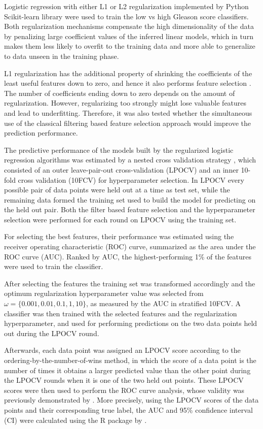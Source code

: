 Logistic regression with either L1 or L2 regularization \citep{Friedman2010}
implemented by Python Scikit-learn library \citep{Pedregosa2011} were used to
train the low vs high Gleason score classifiers. Both regularization mechanisms
compensate the high dimensionality of the data by penalizing large coefficient
values of the inferred linear models, which in turn makes them less likely to
overfit to the training data and more able to generalize to data unseen in the
training phase.

L1 regularization has the additional property of shrinking the coefficients of
the least useful features down to zero, and hence it also performs feature
selection \citep{Park2007}. The number of coefficients ending down to zero
depends on the amount of regularization. However, regularizing too strongly
might lose valuable features and lead to underfitting. Therefore, it was also
tested whether the simultaneous use of the classical filtering based feature
selection approach would improve the prediction performance.

The predictive performance of the models built by the regularized logistic
regression algorithms was estimated by a nested cross validation strategy
\citep{Varma2006}, which consisted of an outer leave-pair-out cross-validation
(LPOCV) \citep{Airola2011} and an inner 10-fold cross validation (10FCV) for
hyperparameter selection. In LPOCV every possible pair of data points were held
out at a time as test set, while the remaining data formed the training set used
to build the model for predicting on the held out pair. Both the filter based
feature selection and the hyperparameter selection were performed for each
round on LPOCV using the training set.

For selecting the best features, their performance was estimated using the
receiver operating characteristic (ROC) curve, summarized as the area under the
ROC curve (AUC). Ranked by AUC, the highest-performing 1\% of the features were
used to train the classifier.

After selecting the features the training set was transformed accordingly and
the optimum regularization hyperparameter value was selected from $\omega =
\{0.001, 0.01, 0.1, 1, 10\}$, as measured by the AUC in stratified 10FCV\@. A
classifier was then trained with the selected features and the regularization
hyperparameter, and used for performing predictions on the two data points held
out during the LPOCV round.

Afterwards, each data point was assigned an LPOCV score according to the
ordering-by-the-number-of-wins method, in which the score of a data point is the
number of times it obtains a larger predicted value than the other point during
the LPOCV rounds when it is one of the two held out points. These LPOCV scores
were then used to perform the ROC curve analysis, whose validity was previously
demonstrated by \citet{Balcan2008}. More precisely, using the LPOCV scores of
the data points and their corresponding true label, the AUC and 95\% confidence
interval (CI) were calculated using the R package by \citet{LeDell2015}.

